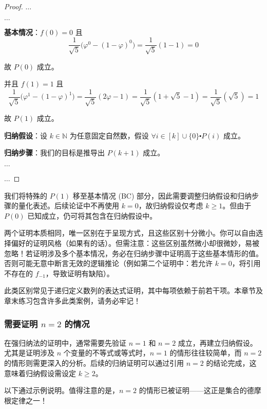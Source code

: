 \begin{proof}

    $\dots$

    $\dots$

    \textbf{基本情况}：$f(0) = 0$ 且
    \[\frac{1}{\sqrt{5}}\big(\varphi^0-(1-\varphi)^0\big) = \frac{1}{\sqrt{5}} (1-1) = 0\]

    故 $P(0)$ 成立。

    并且 $f(1) = 1$ 且
    \[\frac{1}{\sqrt{5}}\big(\varphi^1-(1-\varphi)^1\big) = \frac{1}{\sqrt{5}} (2\varphi-1) = \frac{1}{\sqrt{5}} (1+\sqrt{5}-1) = \frac{1}{\sqrt{5}} (\sqrt{5}) = 1\]
    
    故 $P(1)$ 成立。

    \textbf{归纳假设}：设 $k \in \mathbb{N}$ 为任意固定自然数，假设 $\forall i \in [k] \cup \{0\} \centerdot P(i)$ 成立。

    \textbf{归纳步骤}：我们的目标是推导出 $P(k+1)$ 成立。

    $\dots$

    $\dots$
\end{proof}

我们将特殊的 $P(1)$ 移至基本情况 (BC) 部分，因此需要调整归纳假设和归纳步骤的量化表述。后续论证中不再使用 $k = 0$，故归纳假设仅考虑 $k \ge 1$。但由于 $P(0)$ 已知成立，仍可将其包含在归纳假设中。

两个证明本质相同，唯一区别在于呈现方式，且这些区别十分微小。你可以自由选择偏好的证明风格（如果有的话）。但需注意：这些区别虽然微小却很微妙，易被忽略！若证明涉及多个基本情况，务必在归纳步骤中证明高于这些基本情形的值。否则可能无意中断言无效的逻辑推论（例如第二个证明中：若允许 $k=0$，将引用不存在的 $f_{-1}$，导致证明有缺陷）。

此类区别常见于递归定义数列的表达式证明，其中每项依赖于前若干项。本章节及章末练习包含许多此类案例，请务必牢记！

\subsubsection*{需要证明 $n=2$ 的情况}

在强归纳法的证明中，通常需要先验证 $n = 1$ 和 $n = 2$ 成立，再建立归纳假设。尤其是证明涉及 $n$ 个变量的不等式或等式时，$n = 1$ 的情形往往较简单，而 $n = 2$ 的情形则需更深入的分析。后续的归纳证明可以通过引用 $n = 2$ 的结论完成，这意味着归纳假设需设定 $k \ge 2$。

以下通过示例说明。值得注意的是，$n = 2$ 的情形已被证明——这正是集合的德摩根定律之一！

